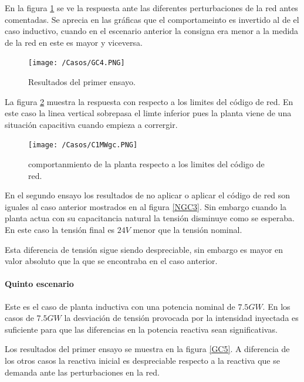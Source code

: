 \documentclass{book}
\begin{document}
En la figura \ref{GC4} se ve la respuesta ante las diferentes perturbaciones de la red antes comentadas. Se aprecia en las gr\'aficas que el comportameinto es invertido al de el caso inductivo, cuando en el escenario anterior la consigna era menor a la medida de la red en este es mayor y viceversa. \par

\begin{figure}[h!]
\centering
\texttt{[image: /Casos/GC4.PNG]}
\caption{Resultados del primer ensayo. }
\label{GC4}
\end{figure} \par

La figura \ref{C1MWgc} muestra la respuesta con respecto a los limites del c\'odigo de red. En este caso la linea vertical sobrepasa el limte inferior pues la planta viene de una situaci\'on capacitiva cuando empieza a corrergir. \par

\begin{figure}[h!]
\centering
\texttt{[image: /Casos/C1MWgc.PNG]}
\caption{comportanmiento de la planta respecto a los limites del c\'odigo de red. }
\label{C1MWgc}
\end{figure} \par

En el segundo ensayo los resultados de no aplicar o aplicar el c\'odigo de red son iguales al caso anterior mostrados en al figura \ref{NGC3}. Sin embargo cuando la planta actua con su capacitancia natural la tensi\'on disminuye como se esperaba. En este caso la tensi\'on final es $24V$ menor que la tensi\'on nominal. \par

Esta diferencia de tensi\'on sigue siendo despreciable, sin embargo es mayor en valor absoluto que la que se encontraba en el caso anterior. \par 

	\paragraph{Quinto escenario}

Este es el caso de planta inductiva con una potencia nominal de $7.5GW$. En los casos de $7.5GW$ la desviaci\'on de tensi\'on provocada por la intensidad inyectada es suficiente para que las diferencias en la potencia reactiva sean significativas. \par

Los resultados del primer ensayo se muestra en la figura \ref{GC5}. A diferencia de los otros casos la reactiva inicial es despreciable respecto a la reactiva que se demanda ante las perturbaciones en la red. \par
\end{document}
